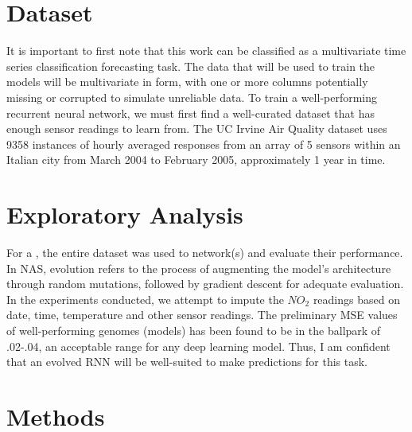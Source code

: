 \documentclass[12pt]{article}
\begin{document}
\section{Dataset}
It is important to first note that this work can be classified as a multivariate time series classification forecasting task. The data that will be used to train the models will be multivariate in form, with one or more columns potentially missing or corrupted to simulate unreliable data.
To train a well-performing recurrent neural network, we must first find a well-curated dataset that has enough sensor readings to learn from. The UC Irvine Air Quality dataset \cite{misc_air_quality_360} uses 9358 instances of hourly averaged responses from an array of 5 sensors within an Italian city from March 2004 to February 2005, approximately 1 year in time.

\section{Exploratory Analysis}
For a , the entire dataset was used to  network(s) and evaluate their performance. In NAS, evolution refers to the process of augmenting the model's architecture through random mutations, followed by gradient descent for adequate evaluation. In the experiments conducted, we attempt to impute the $NO_2$ readings based on date, time, temperature and other sensor readings. The preliminary MSE values of well-performing genomes (models) has been found to be in the ballpark of .02-.04, an acceptable range for any deep learning model. Thus, I am confident that an evolved RNN will be well-suited to make predictions for this task.

\section{Methods}

\end{document}
